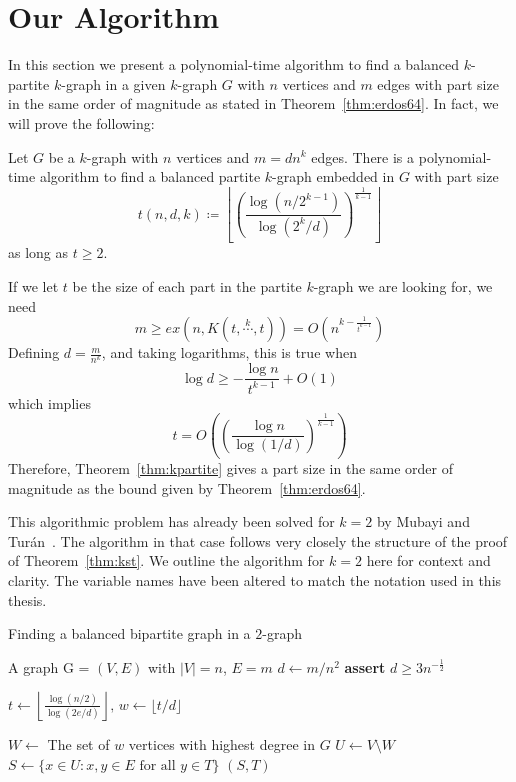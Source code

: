 \section{Our Algorithm}\label{sec:algorithm}

In this section we present a polynomial-time algorithm to find a balanced $k$-partite
$k$-graph in a given $k$-graph $G$
with $n$ vertices and $m$ edges with part size in the same order of magnitude as stated in
Theorem~\ref{thm:erdos64}.
In fact, we will prove the following:

\begin{theorem}\label{thm:kpartite}
    Let $G$ be a $k$-graph with $n$ vertices and $m = dn^k$ edges.
    There is a polynomial-time algorithm
    to find a balanced partite $k$-graph embedded in $G$ with part size
    \[
        t (n, d, k) \coloneqq \left\lfloor
        \left(  \frac{\log (n/2^{k-1})}{\log (2^{k}/d)} \right)
        ^{\frac{1}{k-1}} \right\rfloor
    \]
    as long as $t \geq 2$.
\end{theorem}

\begin{remark}
    If we let $t$ be the size of each part in the partite $k$-graph we are looking for, we need
    \[
        m \geq ex(n, K(t, \overset{k}{\cdots}, t)) = O\left(n^{k - \frac{1}{t^{k-1}}}\right)
    \]
    Defining $d = \frac{m}{n^k}$, and taking logarithms, this is true when
    \[
        \log d \geq - \frac{\log n}{t^{k-1}} + O(1)
    \]
    which implies
    \[
        t = O\left(\left(\frac{\log n}{\log (1/d)}\right)^{\frac{1}{k-1}}\right)
    \]
    Therefore, Theorem~\ref{thm:kpartite} gives a part size in the same order of magnitude as the bound
    given by Theorem~\ref{thm:erdos64}.
\end{remark}

This algorithmic problem has already been solved for $k = 2$ by Mubayi and Turán~\cite{MUBAYI2010174}.
The algorithm in that case follows very closely the structure of the proof of Theorem~\ref{thm:kst}.
We outline the algorithm for $k = 2$ here for context and clarity.
The variable names have been altered to match the notation used in this thesis.

\begin{algorithm}[H]
    \caption{Finding a balanced bipartite graph in a $2$-graph}
    \label{alg:bipartite}
        \begin{algorithmic}[1]
        \Require A graph G = $(V, E)$ with $|V| = n$, $E = m$
        \State $d \gets m / n^2 $
        \State \textbf{assert} $d \geq 3 n^{-\frac{1}{2}}$

        \State $t \gets \left\lfloor\frac{\log (n/2) }
        {\log (2e/d)}\right\rfloor,\, w \gets \lfloor t/d \rfloor$

        \State $W \gets $ The set of $w$ vertices with highest degree in $G$
        \State $U \gets V \setminus W$
            \State $S \gets \{x \in U : {x, y} \in E \text{ for all } y \in T\}$
                \State \Return $(S, T)$
            \EndIf
        \EndFor
        \end{algorithmic}
\end{algorithm}

